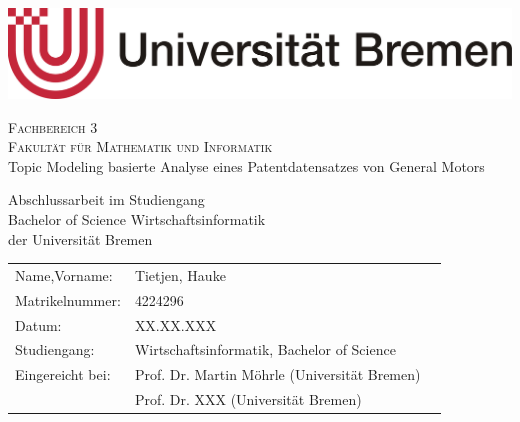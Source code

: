 \begin{titlepage}
\thispagestyle{empty}
  \begin{center}
	
  \includegraphics[scale=0.2]{img/Universitaet_Bremen}\\ \vspace{0.0cm}

	{\Large{\scshape Fachbereich 3}}\\
  {\Large{\scshape Fakultät für Mathematik und Informatik}}\\[2.5cm]
	
	{\LARGE Topic Modeling basierte Analyse eines Patentdatensatzes von General Motors}
  \vspace{2.0cm}
	  
  Abschlussarbeit im Studiengang\\
	Bachelor of Science Wirtschaftsinformatik\\
	der Universität Bremen\\[3cm]

  \begin{tabular}[c]{lll}
		Name,Vorname: & Tietjen, Hauke\\
		Matrikelnummer: & 4224296\\
		Datum: & XX.XX.XXX \\
		Studiengang: & Wirtschaftsinformatik, Bachelor of Science\\
		Eingereicht bei: & Prof. Dr. Martin Möhrle (Universität Bremen)\\
		 & Prof. Dr. XXX (Universität Bremen)
	\end{tabular}
  \end{center}
\end{titlepage}